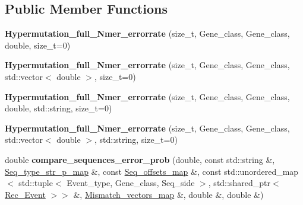 \subsection*{Public Member Functions}
\begin{DoxyCompactItemize}
\item 
\mbox{\label{classHypermutation__full__Nmer__errorrate_ae5c78aa08882abf2ae207f291bddefc0}} 
{\bfseries Hypermutation\+\_\+full\+\_\+\+Nmer\+\_\+errorrate} (size\+\_\+t, Gene\+\_\+class, Gene\+\_\+class, double, size\+\_\+t=0)
\item 
\mbox{\label{classHypermutation__full__Nmer__errorrate_abf30127d93616a5a79a50997248072e5}} 
{\bfseries Hypermutation\+\_\+full\+\_\+\+Nmer\+\_\+errorrate} (size\+\_\+t, Gene\+\_\+class, Gene\+\_\+class, std\+::vector$<$ double $>$, size\+\_\+t=0)
\item 
\mbox{\label{classHypermutation__full__Nmer__errorrate_ab84a6d5b251ca3768312f12ef1dabb22}} 
{\bfseries Hypermutation\+\_\+full\+\_\+\+Nmer\+\_\+errorrate} (size\+\_\+t, Gene\+\_\+class, Gene\+\_\+class, double, std\+::string, size\+\_\+t=0)
\item 
\mbox{\label{classHypermutation__full__Nmer__errorrate_a5d46938132c4161595c9e8262f88207a}} 
{\bfseries Hypermutation\+\_\+full\+\_\+\+Nmer\+\_\+errorrate} (size\+\_\+t, Gene\+\_\+class, Gene\+\_\+class, std\+::vector$<$ double $>$, std\+::string, size\+\_\+t=0)
\item 
\mbox{\label{classHypermutation__full__Nmer__errorrate_a08bda80384e58115d3d391198b02ecca}} 
double {\bfseries compare\+\_\+sequences\+\_\+error\+\_\+prob} (double, const std\+::string \&, \hyperlink{classEnum__fast__memory__map}{Seq\+\_\+type\+\_\+str\+\_\+p\+\_\+map} \&, const \hyperlink{classEnum__fast__memory__dual__key__map}{Seq\+\_\+offsets\+\_\+map} \&, const std\+::unordered\+\_\+map$<$ std\+::tuple$<$ Event\+\_\+type, Gene\+\_\+class, Seq\+\_\+side $>$, std\+::shared\+\_\+ptr$<$ \hyperlink{classRec__Event}{Rec\+\_\+\+Event} $>$$>$ \&, \hyperlink{classEnum__fast__memory__map}{Mismatch\+\_\+vectors\+\_\+map} \&, double \&, double \&)
\item 
$$
\end{DoxyCompactItemize}
